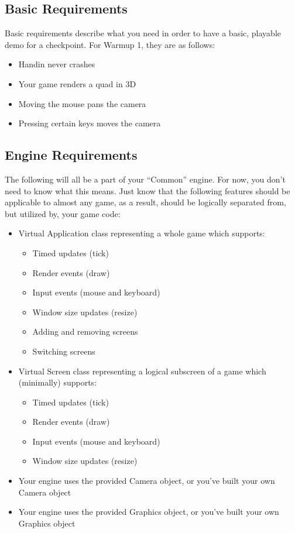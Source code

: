 \documentclass{../cs195u}
\begin{document}
\subsection*{Basic Requirements}
Basic requirements describe what you need in order to have a basic, playable demo for a checkpoint.
For Warmup 1, they are as follows:
 \begin{itemize}
\item Handin never crashes
\item Your game renders a quad in 3D
\item Moving the mouse pans the camera
\item Pressing certain keys moves the camera
 \end{itemize}

  \subsection*{Engine Requirements}
  The following will all be a part of your ``Common'' engine. For now, you don't need to know what this means. Just know that the following features should be applicable to almost any game, as a result, should be logically separated from, but utilized by, your game code:
  \begin{itemize}
    \item Virtual Application class representing a whole game which supports:
    \begin{itemize}
     	\item Timed updates (tick)
     	\item Render events (draw)
     	\item Input events (mouse and keyboard)
     	\item Window size updates (resize)
	\item Adding and removing screens
	\item Switching screens
    \end{itemize}
    \item Virtual Screen class representing a logical subscreen of a game which (minimally) supports:
    \begin{itemize}
     \item Timed updates (tick)
     \item Render events (draw)
     \item Input events (mouse and keyboard)
     \item Window size updates (resize)
    \end{itemize}
\item Your engine uses the provided Camera object, or you’ve built your own Camera object
\item Your engine uses the provided Graphics object, or you’ve built your own Graphics object
   \end{itemize}
 
\end{document}
